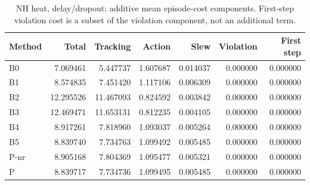 \begin{table}[ht]
\centering\small
\caption{NH heat, delay/dropout: additive mean episode-cost components. First-step violation cost is a subset of the violation component, not an additional term.}\label{tab:new_heat_costparts_locked_delay_dropout}
\begin{tabular}{@{}lrrrrrr@{}}\toprule
Method & Total & Tracking & Action & Slew & Violation & First step\\\midrule
B0 & 7.069461 & 5.447737 & 1.607687 & 0.014037 & 0.000000 & 0.000000\\
B1 & 8.574835 & 7.451420 & 1.117106 & 0.006309 & 0.000000 & 0.000000\\
B2 & 12.295526 & 11.467093 & 0.824592 & 0.003842 & 0.000000 & 0.000000\\
B3 & 12.469471 & 11.653131 & 0.812235 & 0.004105 & 0.000000 & 0.000000\\
B4 & 8.917261 & 7.818960 & 1.093037 & 0.005264 & 0.000000 & 0.000000\\
B5 & 8.839740 & 7.734763 & 1.099492 & 0.005485 & 0.000000 & 0.000000\\
P-nr & 8.905168 & 7.804369 & 1.095477 & 0.005321 & 0.000000 & 0.000000\\
P & 8.839717 & 7.734736 & 1.099495 & 0.005485 & 0.000000 & 0.000000\\
\bottomrule\end{tabular}
\end{table}
